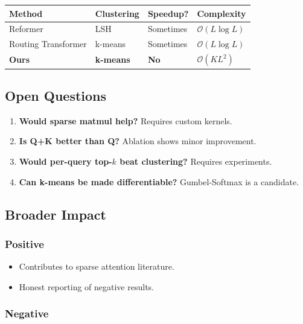 \begin{table}[H]
\centering
\small
\begin{tabular}{llll}
\toprule
\textbf{Method} & \textbf{Clustering} & \textbf{Speedup?} & \textbf{Complexity} \\
\midrule
Reformer & LSH & Sometimes & $\mathcal{O}(L \log L)$ \\
Routing Transformer & k-means & Sometimes & $\mathcal{O}(L \log L)$ \\
\textbf{Ours} & \textbf{k-means} & \textbf{No} & \textbf{$\mathcal{O}(K L^2)$} \\
\bottomrule
\end{tabular}
\end{table}

\subsection{Open Questions}

\begin{enumerate}
\item \textbf{Would sparse matmul help?} Requires custom kernels.
\item \textbf{Is Q+K better than Q?} Ablation shows minor improvement.
\item \textbf{Would per-query top-$k$ beat clustering?} Requires experiments.
\item \textbf{Can k-means be made differentiable?} Gumbel-Softmax is a candidate.

\end{enumerate}
\subsection{Broader Impact}

\subsubsection{Positive}

\begin{itemize}
\item Contributes to sparse attention literature.
\item Honest reporting of negative results.

\end{itemize}
\subsubsection{Negative}

